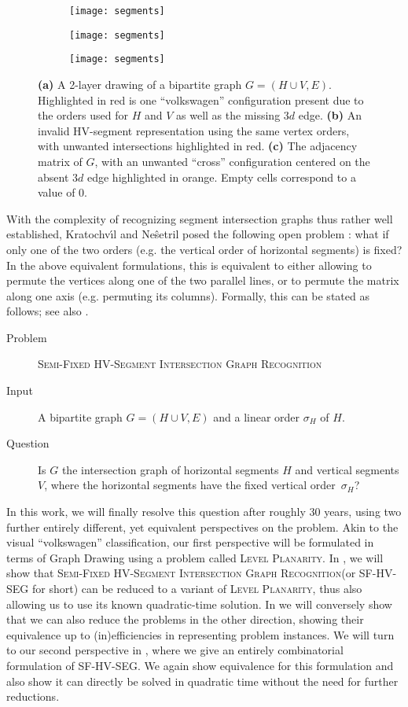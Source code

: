 \documentclass[runningheads]{llncs}
\newcommand{\myproblem}[3]{
  \par
\begin{description}
      \item[Problem] #1
      \item[Input] #2
      \item[Question] #3
    \end{description}
\par
}
\newcommand{\hvprob}{\textsc{Semi-Fixed HV-Segment Intersection Graph Recognition}\xspace}
\newcommand{\hvp}{\textsc{SF-HV-SEG}\xspace}
\begin{document}
\begin{figure}[t]
  \begin{subfigure}{.15\textwidth}
    \texttt{[image: segments]}
    \subcaption{}
    \label{fig:volkswagen}
  \end{subfigure}\begin{subfigure}{.48\textwidth}
    \centering
    \texttt{[image: segments]}
    \subcaption{}
    \label{fig:segments-alpha}
  \end{subfigure}\begin{subfigure}{.37\textwidth}
    \texttt{[image: segments]}
    \subcaption{}
    \label{fig:matrix-cross}
  \end{subfigure}
  \caption{
    \textbf{(a)} A 2-layer drawing of a bipartite graph $G=(H\cup V, E)$.
      Highlighted in red is one ``volkswagen'' configuration present due to the orders used for $H$ and $V$ as well as the missing $3d$ edge.
    \textbf{(b)} An invalid HV-segment representation using the same vertex orders, with unwanted intersections highlighted in red.
    \textbf{(c)} The adjacency matrix of $G$, with an unwanted ``cross'' configuration centered on the absent $3d$ edge highlighted in orange. Empty cells correspond to a value of 0.
  }
  \label{fig:example}
\end{figure}
  
With the complexity of recognizing segment intersection graphs thus rather well established, Kratochv{\'\i}l and Neŝetril posed the following open problem \cite{kra-asp-94,nf-ppa-92}:
what if only one of the two orders (e.g. the vertical order of horizontal segments) is fixed?
In the above equivalent formulations, this is equivalent to either allowing to permute the vertices along one of the two parallel lines, or to permute the matrix along one axis (e.g. permuting its columns).
Formally, this can be stated as follows; see also .
\myproblem{\hvprob}{
  A bipartite graph $G = (H \cup V, E)$ and a linear order $\sigma_H$ of $H$.
}{
  Is $G$ the intersection graph of horizontal segments $H$ and vertical segments $V$, where the horizontal segments have the fixed vertical order~$\sigma_H$?
}

In this work, we will finally resolve this question after roughly 30 years, using two further entirely different, yet equivalent perspectives on the problem.
Akin to the visual ``volkswagen'' classification, our first perspective will be formulated in terms of Graph Drawing using a problem called \textsc{Level Planarity}.
In , we will show that \hvprob (or \hvp for short) can be reduced to a variant of \textsc{Level Planarity}, thus also allowing us to use its known quadratic-time solution.
In  we will conversely show that we can also reduce the problems in the other direction, showing their equivalence up to (in)efficiencies in representing problem instances.
We will turn to our second perspective in , where we give an entirely combinatorial formulation of \hvp.
We again show equivalence for this formulation and also show it can directly be solved in quadratic time without the need for further reductions.
\end{document}
